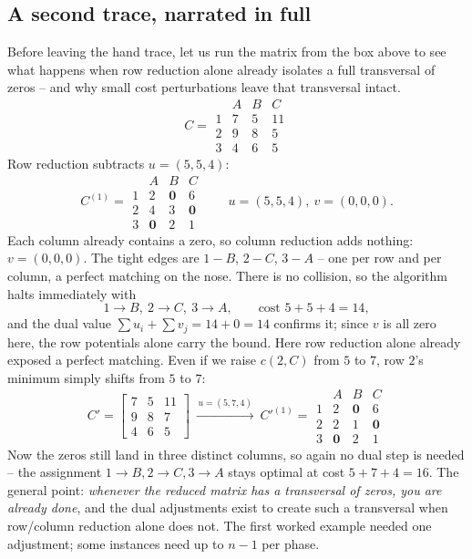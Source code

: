 \subsection{A second trace, narrated in full}

Before leaving the hand trace, let us run the matrix from the box above to see what happens when row reduction alone already isolates a full transversal of zeros -- and why small cost perturbations leave that transversal intact.
\[
  C=\begin{array}{c|ccc}
      & A & B & C\\\hline
    1 & 7 & 5 & 11\\
    2 & 9 & 8 & 5\\
    3 & 4 & 6 & 5
  \end{array}
\]
Row reduction subtracts $u=(5,5,4)$:
\[
C^{(1)}=\begin{array}{c|ccc}
   & A & B & C\\\hline
 1 & 2 & \mathbf{0} & 6\\
 2 & 4 & 3 & \mathbf{0}\\
 3 & \mathbf{0} & 2 & 1
\end{array}
\qquad u=(5,5,4),\ v=(0,0,0).
\]
Each column already contains a zero, so column reduction adds nothing: $v=(0,0,0)$. The tight edges are $1\!-\!B$, $2\!-\!C$, $3\!-\!A$ -- one per row and per column, a perfect matching on the nose. There is no collision, so the algorithm halts immediately with
\[
\boxed{1\to B,\ 2\to C,\ 3\to A},\qquad \text{cost } 5+5+4 = 14,
\]
and the dual value $\sum u_i + \sum v_j = 14 + 0 = 14$ confirms it; since $v$ is all zero here, the row potentials alone carry the bound. Here row reduction alone already exposed a perfect matching. Even if we raise $c(2,C)$ from $5$ to $7$, row $2$'s minimum simply shifts from $5$ to $7$:
\[
C'=\left[\begin{smallmatrix} 7&5&11\\ 9&8&7\\ 4&6&5\end{smallmatrix}\right]
\ \xrightarrow{\,u=(5,7,4)\,}\
C'^{(1)}=\begin{array}{c|ccc}
   & A & B & C\\\hline
 1 & 2 & \mathbf{0} & 6\\
 2 & 2 & 1 & \mathbf{0}\\
 3 & \mathbf{0} & 2 & 1
\end{array}
\]
Now the zeros still land in three distinct columns, so again no dual step is needed -- the assignment $1\!\to\!B,2\!\to\!C,3\!\to\!A$ stays optimal at cost $5+7+4=16$. The general point: \emph{whenever the reduced matrix has a transversal of zeros, you are already done}, and the dual adjustments exist to create such a transversal when row/column reduction alone does not. The first worked example needed one adjustment; some instances need up to $n-1$ per phase.

